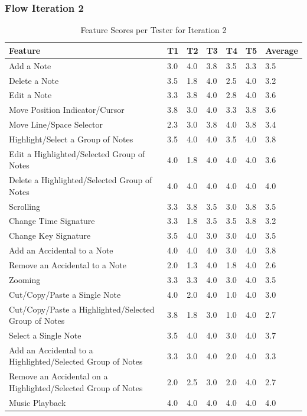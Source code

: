 			\subsubsection{Flow Iteration 2}
				\begin{longtable}{|p{5cm}|R{.7cm}|R{.7cm}|R{.7cm}|R{.7cm}|R{.7cm}|R{1.5cm}|}
				  \caption{Feature Scores per Tester for Iteration 2} \label{tab:results-features-it2} \\ 
				  	\hline
				  	\textbf{Feature} & \textbf{T1} & \textbf{T2} & \textbf{T3} & \textbf{T4} & \textbf{T5} & \textbf{Average} \\ \hline
					Add a Note 																							& 3.0 & 4.0 & 3.8 & 3.5 & 3.3 & 3.5 \\ \hline
					Delete a Note 																						& 3.5 & 1.8 & 4.0 & 2.5 & 4.0 & 3.2 \\ \hline
					Edit a Note 																							& 3.3 & 3.8 & 4.0 & 2.8 & 4.0 & 3.6 \\ \hline
					Move Position Indicator/Cursor 															& 3.8 & 3.0 & 4.0 & 3.3 & 3.8 & 3.6 \\ \hline
					Move Line/Space Selector 																	& 2.3 & 3.0 & 3.8 & 4.0 & 3.8 & 3.4 \\ \hline
					Highlight/Select a Group of Notes 														& 3.5 & 4.0 & 4.0 & 3.5 & 4.0 & 3.8 \\ \hline
					Edit a Highlighted/Selected Group of Notes 										& 4.0 & 1.8 & 4.0 & 4.0 & 4.0 & 3.6 \\ \hline
					Delete a Highlighted/Selected Group of Notes 									& 4.0 & 4.0 & 4.0 & 4.0 & 4.0 & 4.0 \\ \hline
					Scrolling																								& 3.3 & 3.8 & 3.5 & 3.0 & 3.8 & 3.5 \\ \hline
					Change Time Signature 																		& 3.3 & 1.8 & 3.5 & 3.5 & 3.8 & 3.2 \\ \hline
					Change Key Signature 																		& 3.5 & 4.0 & 3.0 & 3.0 & 4.0 & 3.5 \\ \hline
					Add an Accidental to a Note 																& 4.0 & 4.0 & 4.0 & 3.0 & 4.0 & 3.8 \\ \hline
					Remove an Accidental to a Note 														& 2.0 & 1.3 & 4.0 & 1.8 & 4.0 & 2.6 \\ \hline
					Zooming 																								& 3.3 & 3.3 & 4.0 & 3.0 & 4.0 & 3.5 \\ \hline
					Cut/Copy/Paste a Single Note 															& 4.0 & 2.0 & 4.0 & 1.0 & 4.0 & 3.0 \\ \hline
					Cut/Copy/Paste a Highlighted/Selected Group of Notes 					& 3.8 & 1.8 & 3.0 & 1.0 & 4.0 & 2.7 \\ \hline
					Select a Single Note 																			& 3.5 & 4.0 & 4.0 & 3.0 & 4.0 & 3.7 \\ \hline
					Add an Accidental to a Highlighted/Selected Group of Notes 			& 3.3 & 3.0 & 4.0 & 2.0 & 4.0 & 3.3 \\ \hline
					Remove an Accidental on a Highlighted/Selected Group of Notes 	& 2.0 & 2.5 & 3.0 & 2.0 & 4.0 & 2.7 \\ \hline
					Music Playback 																					& 4.0 & 4.0 & 4.0 & 4.0 & 4.0 & 4.0 \\ \hline


\end{longtable}
